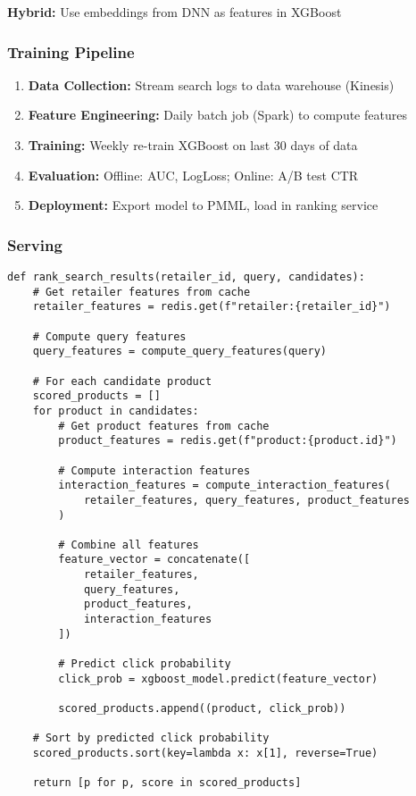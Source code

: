 \documentclass[11pt,letterpaper]{article}
\begin{document}
\textbf{Hybrid:} Use embeddings from DNN as features in XGBoost

\subsubsection{Training Pipeline}

\begin{enumerate}
    \item \textbf{Data Collection:} Stream search logs to data warehouse (Kinesis)
    \item \textbf{Feature Engineering:} Daily batch job (Spark) to compute features
    \item \textbf{Training:} Weekly re-train XGBoost on last 30 days of data
    \item \textbf{Evaluation:} Offline: AUC, LogLoss; Online: A/B test CTR
    \item \textbf{Deployment:} Export model to PMML, load in ranking service
\end{enumerate}

\subsubsection{Serving}

\begin{lstlisting}
def rank_search_results(retailer_id, query, candidates):
    # Get retailer features from cache
    retailer_features = redis.get(f"retailer:{retailer_id}")

    # Compute query features
    query_features = compute_query_features(query)

    # For each candidate product
    scored_products = []
    for product in candidates:
        # Get product features from cache
        product_features = redis.get(f"product:{product.id}")

        # Compute interaction features
        interaction_features = compute_interaction_features(
            retailer_features, query_features, product_features
        )

        # Combine all features
        feature_vector = concatenate([
            retailer_features,
            query_features,
            product_features,
            interaction_features
        ])

        # Predict click probability
        click_prob = xgboost_model.predict(feature_vector)

        scored_products.append((product, click_prob))

    # Sort by predicted click probability
    scored_products.sort(key=lambda x: x[1], reverse=True)

    return [p for p, score in scored_products]
\end{lstlisting}
\end{document}
